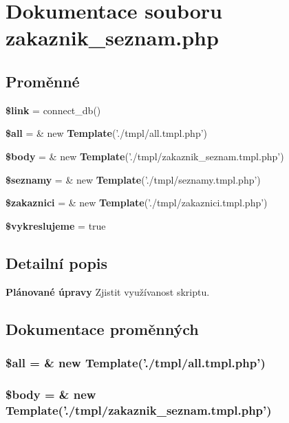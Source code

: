 \section{Dokumentace souboru zakaznik\_\-seznam.php}
\label{zakaznik__seznam_8php}
\subsection*{Proměnné}
\begin{CompactItemize}
\item 
{\bf \$link} = connect\_\-db()
\item 
{\bf \$all} = \& new {\bf Template}('./tmpl/all.tmpl.php')
\item 
{\bf \$body} = \& new {\bf Template}('./tmpl/zakaznik\_\-seznam.tmpl.php')
\item 
{\bf \$seznamy} = \& new {\bf Template}('./tmpl/seznamy.tmpl.php')
\item 
{\bf \$zakaznici} = \& new {\bf Template}('./tmpl/zakaznici.tmpl.php')
\item 
{\bf \$vykreslujeme} = true
\end{CompactItemize}


\subsection{Detailní popis}
\begin{Desc}
\item[{\bf Plánované úpravy}]Zjistit využívanost skriptu. \end{Desc}


\subsection{Dokumentace proměnných}
\subsubsection{\setlength{\rightskip}{0pt plus 5cm}\$all = \& new {\bf Template}('./tmpl/all.tmpl.php')}\label{zakaznik__seznam_8php_3c74ea9d2348c9aba28d36e692bef2d2}


\subsubsection{\setlength{\rightskip}{0pt plus 5cm}\$body = \& new {\bf Template}('./tmpl/zakaznik\_\-seznam.tmpl.php')}\label{zakaznik__seznam_8php_26b9f9373f7bb79dfcf8a86dff086b45}


